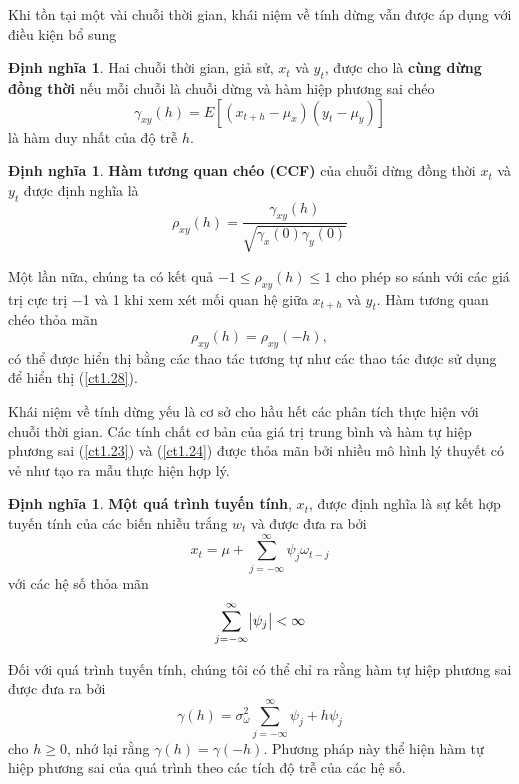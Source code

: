 \documentclass[12pt, a4paper,oneside]{book}
\theoremstyle{definition}
\newtheorem{dn}[theo]{Định nghĩa}
\begin{document}
Khi tồn tại một vài chuỗi thời gian, khái niệm về tính dừng vẫn được áp dụng với điều kiện bổ sung

\begin{dn} Hai chuỗi thời gian, giả sử, $x_{t}$ và $y_{t}$, được cho là \textbf{cùng dừng đồng thời} nếu mỗi chuỗi là chuỗi dừng và hàm hiệp phương sai chéo
	\begin{equation}
		\gamma_{xy}(h)=E[(x_{t+h}-\mu_{x})(y_{t}-\mu_{y})] \label{ct1.30}
	\end{equation}
là hàm duy nhất của độ trễ $h$. 
\end{dn}
\begin{dn}\textbf{Hàm tương quan chéo (CCF)} của chuỗi dừng đồng thời $x_{t}$ và $y_{t}$ được định nghĩa là
	\begin{equation}
		\rho_{xy}(h)=\dfrac{\gamma_{xy}(h)}{\sqrt{\gamma_{x}(0)\gamma_{y}(0)}} \label{ct1.31}
	\end{equation}	
\end{dn}

Một lần nữa, chúng ta có kết quả $−1\leqslant \rho_{xy}(h) \leqslant 1$ cho phép so sánh với các giá trị cực trị −1 và 1 khi xem xét mối quan hệ giữa $x_{t+h}$ và $y_{t}$. Hàm tương quan chéo thỏa mãn 
\begin{equation}
	\rho_{xy}(h)=\rho_{xy}(-h), \label{ct1.32}
\end{equation}
có thể được hiển thị bằng các thao tác tương tự như các thao tác được sử dụng để hiển thị (\ref{ct1.28}).

Khái niệm về tính dừng yếu là cơ sở cho hầu hết các phân tích thực hiện với chuỗi thời gian. Các tính chất cơ bản của giá trị trung bình và hàm tự hiệp phương sai (\ref{ct1.23}) và (\ref{ct1.24}) được thỏa mãn bởi nhiều mô hình lý thuyết có vẻ như tạo ra mẫu thực hiện hợp lý.
\begin{dn}\textbf{Một quá trình tuyến tính}, $x_{t}$, được định nghĩa là sự kết hợp tuyến tính của các biến nhiễu trắng $w_{t}$ và được đưa ra bởi
	\begin{equation}
	x_{t}=\mu+\sum_{j=-\infty}^{\infty}\psi_{j}\omega_{t-j}  \label{ct1.33}	
	\end{equation}
	với các hệ số thỏa mãn
	\begin{equation}
		\sum_{j=-\infty}^{\infty}\abs{\psi_{j}}<\infty \label{ct1.34}
	\end{equation}	
\end{dn}

Đối với quá trình tuyến tính, chúng tôi có thể chỉ ra rằng hàm tự hiệp phương sai được đưa ra bởi
\begin{equation}
\gamma(h)=\sigma_{\omega}^2 \sum_{j=-\infty}^{\infty}\psi_{j}+h\psi_{j} \label{ct1.35}
\end{equation}
cho $ h\geqslant0 $, nhớ lại rằng $\gamma(h)=\gamma(-h)$. Phương pháp này thể hiện hàm tự hiệp phương sai của quá trình theo các tích độ trễ của các hệ số.
\end{document}
